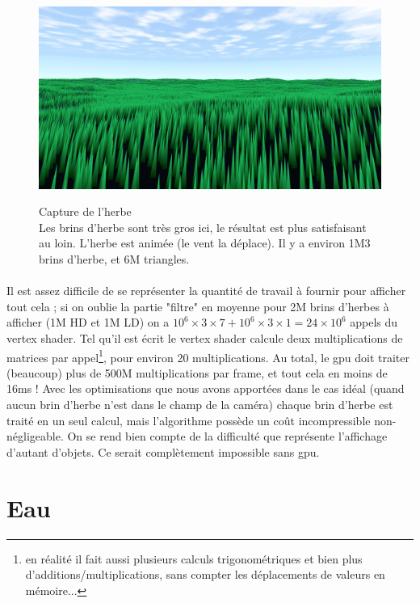 \documentclass{EPUProjetDi}
\begin{document}
\begin{figure}[H]
	\centering
	\caption[Capture de l'herbe]{Capture de l'herbe\\Les brins d'herbe sont très gros ici, le résultat est plus satisfaisant au loin. L'herbe est animée (le vent la déplace). Il y a environ 1M3 brins d'herbe, et 6M triangles.}
	\includegraphics[scale=.35]{grass}
	\label{fig:grass}
\end{figure}

\paragraph{}
Il est assez difficile de se représenter la quantité de travail à fournir pour afficher tout cela ; si on oublie la partie "filtre" en moyenne pour 2M brins d'herbes à afficher (1M HD et 1M LD) on a $10^6\times3\times7 + 10^6\times3\times1=24\times10^6$ appels du vertex shader. Tel qu'il est écrit le vertex shader calcule deux multiplications de matrices par appel\footnote{en réalité il fait aussi plusieurs calculs trigonométriques et bien plus d'additions/multiplications, sans compter les déplacements de valeurs en mémoire...}, pour environ 20 multiplications. Au total, le gpu doit traiter (beaucoup) plus de 500M multiplications par frame, et tout cela en moins de 16ms ! Avec les optimisations que nous avons apportées dans le cas idéal (quand aucun brin d'herbe n'est dans le champ de la caméra) chaque brin d'herbe est traité en un seul calcul, mais l'algorithme possède un coût incompressible non-négligeable. On se rend bien compte de la difficulté que représente l'affichage d'autant d'objets. Ce serait complètement impossible sans gpu.

\section{Eau}
\label{section:Eau}
\end{document}
